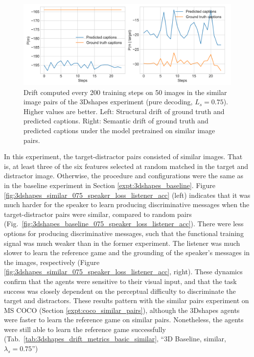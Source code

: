 \begin{figure}[h]
	\centering
	\includegraphics[width=\linewidth]{images/3dshapes_structural_semantic_drift_4000_pure_075_similar.png}
	\caption{Drift computed every 200 training steps on 50 images in the similar image pairs of the 3Dshapes experiment (pure decoding, $L_s = 0.75$). Higher values are better. Left: Structural drift of ground truth and predicted captions. Right: Semantic drift of ground truth and predicted captions under the model pretrained on similar image pairs.} 
	\label{fig:3dshapes_similar_075_str_sem_drift}
\end{figure}

In this experiment, the target-distractor pairs consisted of similar images. That is, at least three of the six features selected at random matched in the target and distractor image. Otherwise, the procedure and configurations were the same as in the baseline experiment in Section \ref{expt:3dshapes_baseline}. 
Figure \ref{fig:3dshapes_similar_075_speaker_loss_listener_acc} (left) indicates that it was much harder for the speaker to learn producing discriminative messages when the target-distractor pairs were similar, compared to random pairs (Fig.~\ref{fig:3dshapes_baseline_075_speaker_loss_listener_acc}). There were less options for producing discriminative messages, such that the functional training signal was much weaker than in the former experiment. The listener was much slower to learn the reference game and the grounding of the speaker's messages in the images, respectively (Figure \ref{fig:3dshapes_similar_075_speaker_loss_listener_acc}, right). These dynamics confirm that the agents were sensitive to their visual input, and that the task success was closely dependent on the perceptual difficulty to discriminate the target and distractors. These results pattern with the similar pairs experiment on MS COCO (Section \ref{expt:coco_similar_pairs}), although the 3Dshapes agents were faster to learn the reference game on similar pairs. Nonetheless, the agents were still able to learn the reference game successfully (Tab.~\ref{tab:3dshapes_drift_metrics_basic_similar}, ``3D Baseline, similar, $\lambda_s = 0.75$'')

